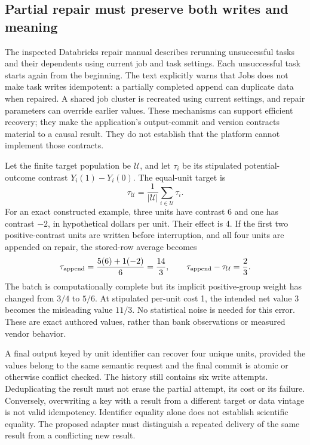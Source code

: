 \subsection{Partial repair must preserve both writes and meaning}

The inspected Databricks repair manual describes rerunning unsuccessful tasks
and their dependents using current job and task settings. Each unsuccessful
task starts again from the beginning. The text explicitly warns that Jobs does
not make task writes idempotent: a partially completed append can duplicate data
when repaired. A shared job cluster is recreated using current settings, and
repair parameters can override earlier values. These mechanisms can support
efficient recovery; they make the application's output-commit and version
contracts material to a causal result. They do not establish that the platform
cannot implement those contracts.~\citep{exec22_workflow_databricks_repair}

Let the finite target population be $\mathcal U$, and let $\tau_i$ be its
stipulated potential-outcome contrast $Y_i(1)-Y_i(0)$. The equal-unit target is
\begin{equation}
 \tau_{\mathcal U}=\frac{1}{|\mathcal U|}\sum_{i\in\mathcal U}\tau_i.
 \label{exec22:workflow-target}
\end{equation}
For an exact constructed example, three units have contrast 6 and one has
contrast $-2$, in hypothetical dollars per unit. Their effect is 4. If the
first two positive-contrast units are written before interruption, and all
four units are appended on repair, the stored-row average becomes
\begin{equation}
 \tau_{\rm append}=\frac{5(6)+1(-2)}{6}=\frac{14}{3},
 \qquad \tau_{\rm append}-\tau_{\mathcal U}=\frac{2}{3}.
 \label{exec22:workflow-duplicates}
\end{equation}
The batch is computationally complete but its implicit positive-group weight
has changed from $3/4$ to $5/6$. At stipulated per-unit cost 1, the intended
net value 3 becomes the misleading value $11/3$. No statistical noise is
needed for this error. These are exact authored values, rather than bank
observations or measured vendor behavior.~\citep{exec22_workflow_reference}

A final output keyed by unit identifier can recover four unique units, provided
the values belong to the same semantic request and the final commit is atomic
or otherwise conflict checked. The history still contains six write attempts.
Deduplicating the result must not erase the partial attempt, its cost or its
failure. Conversely, overwriting a key with a result from a different target
or data vintage is not valid idempotency. Identifier equality alone does not
establish scientific equality. The proposed adapter must distinguish a repeated
delivery of the same result from a conflicting new result.

